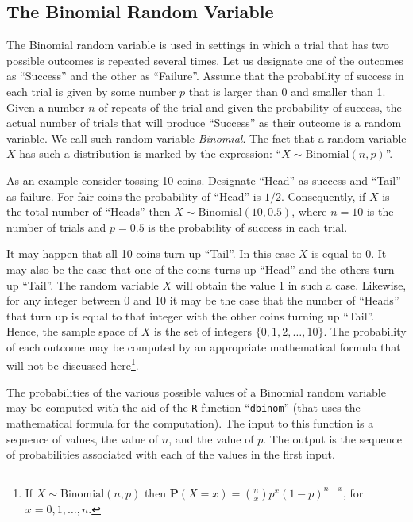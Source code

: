 \documentclass[
]{krantz}
\newcommand{\Prob}{\mathbf{P}}
\theoremstyle{definition}
\theoremstyle{definition}
\theoremstyle{definition}
\theoremstyle{remark}
\begin{document}
\hypertarget{the-binomial-random-variable}{%
\subsection{The Binomial Random Variable}\label{the-binomial-random-variable}}

The Binomial random variable is used in settings in which a trial that
has two possible outcomes is repeated several times. Let us designate
one of the outcomes as ``Success'' and the other as ``Failure''. Assume that
the probability of success in each trial is given by some number \(p\)
that is larger than 0 and smaller than 1. Given a number \(n\) of repeats
of the trial and given the probability of success, the actual number of
trials that will produce ``Success'' as their outcome is a random
variable. We call such random variable \emph{Binomial}. The fact that a
random variable \(X\) has such a distribution is marked by the expression:
``\(X \sim \mathrm{Binomial}(n,p)\)''.

As an example consider tossing 10 coins. Designate ``Head'' as success and
``Tail'' as failure. For fair coins the probability of ``Head'' is \(1/2\).
Consequently, if \(X\) is the total number of ``Heads'' then
\(X \sim \mathrm{Binomial}(10,0.5)\), where \(n=10\) is the number of trials
and \(p=0.5\) is the probability of success in each trial.

It may happen that all 10 coins turn up ``Tail''. In this case \(X\) is
equal to 0. It may also be the case that one of the coins turns up
``Head'' and the others turn up ``Tail''. The random variable \(X\) will
obtain the value 1 in such a case. Likewise, for any integer between 0
and 10 it may be the case that the number of ``Heads'' that turn up is
equal to that integer with the other coins turning up ``Tail''. Hence, the
sample space of \(X\) is the set of integers \(\{0, 1, 2, \ldots, 10\}\).
The probability of each outcome may be computed by an appropriate
mathematical formula that will not be discussed here\footnote{If \(X\sim \mathrm{Binomial}(n,p)\) then
  \(\Prob(X = x) = {n \choose x} p^x (1-p)^{n-x}\), for
  \(x = 0, 1, \ldots, n\).}.

The probabilities of the various possible values of a Binomial random
variable may be computed with the aid of the \texttt{R} function ``\texttt{dbinom}''
(that uses the mathematical formula for the computation). The input to
this function is a sequence of values, the value of \(n\), and the value
of \(p\). The output is the sequence of probabilities associated with each
of the values in the first input.
\end{document}
